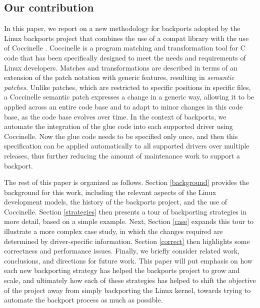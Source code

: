 \subsection{Our contribution}

In this paper, we report on a new methodology for backports adopted by the
Linux backports project that combines the use of a compat library with the
use of Coccinelle \cite{Padioleau:eurosys08}. Coccinelle is a program
matching and transformation tool for C code that has been specifically
designed to meet the needs and requirements of Linux developers.  Matches
and transformations are described in terms of an extension of the patch
notation with generic features, resulting in {\em semantic patches}.
Unlike patches, which are restricted to specific positions in specific
files, a Coccinelle semantic patch expresses a change in a generic way,
allowing it to be applied across an entire code base and to adapt to minor
changes in this code base, as the code base evolves over time.  In the
context of backports, we automate the integration of the glue code into
each supported driver using Coccinelle.  Now the glue code needs to be
specified only once, and then this specification can be applied
automatically to all supported drivers over multiple releases, thus further
reducing the amount of maintenance work to support a backport.

The rest of this paper is organized as follows.  Section \ref{background}
provides the background for this work, including the relevant aspects of
the Linux development models, the history of the backports project, and the
use of Coccinelle.  Section \ref{strategies} then presents a tour of
backporting strategies in more detail, based on a simple example. Next,
Section \ref{case} expands this tour to illustrate a more complex case
study, in which the changes required are determined by driver-specific
information.  Section \ref{correct} then highlights some correctness and
performance issues.  Finally, we briefly consider related work,
conclusions, and directions for future work.  This paper will put emphasis
on how each new backporting strategy has helped the backports project to
grow and scale, and ultimately how each of these strategies has helped to
shift the objective of the project away from simply backporting the Linux
kernel, towards trying to automate the backport process as much as
possible.

